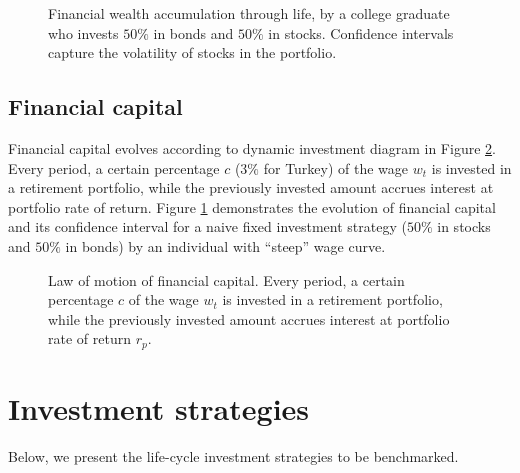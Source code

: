 \begin{figure}[h!]
\begin{minipage}{0.45\textwidth}
		\caption{Financial wealth accumulation through life, by a college graduate who invests $50\%$ in bonds and $50\%$ in stocks. Confidence intervals capture the volatility of stocks in the portfolio.}
		\label{fig:fincap}
	\end{minipage}
\end{figure}

\subsection{Financial capital}

Financial capital evolves according to dynamic investment diagram in Figure \ref{fig:invdiag}. Every period, a certain percentage $c$ ($3\%$ for Turkey) of the wage $w_t$ is invested in a retirement portfolio, while the previously invested amount accrues interest at portfolio rate of return. Figure \ref{fig:fincap} demonstrates the evolution of financial capital and its confidence interval for a naive fixed investment strategy ($50\%$ in stocks and $50\%$ in bonds) by an individual with ``steep'' wage curve.

\begin{figure}[h!]
	\centering
	\caption{Law of motion of financial capital. Every period, a certain percentage $c$ of the wage $w_t$ is invested in a retirement portfolio, while the previously invested amount accrues interest at portfolio rate of return $r_p$.}
	\label{fig:invdiag}
\end{figure}


\section{Investment strategies}

Below, we present the life-cycle investment strategies to be benchmarked.

